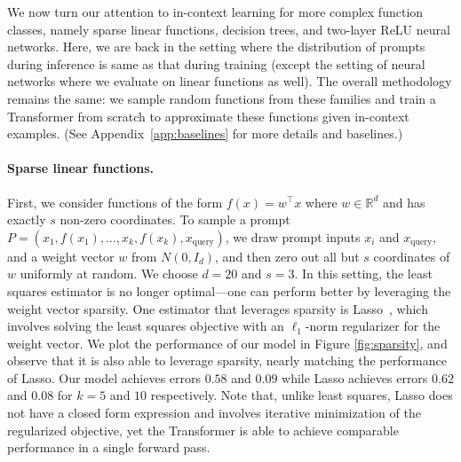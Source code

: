 We now turn our attention to in-context learning for more complex function classes, namely sparse linear functions, decision trees, and two-layer ReLU neural networks. Here, we are back in the setting where the distribution of prompts during inference is same as that during training (except the setting of neural networks where we evaluate on linear functions as well).
The overall methodology remains the same: we sample random functions from these families and train a Transformer from scratch to approximate these functions given in-context examples. (See Appendix~\ref{app:baselines} for more details and baselines.) 

\paragraph{Sparse linear functions.}
First, we consider functions of the form $f(x) = w^\top x$ where $w \in \mathbb{R}^d$ and has exactly $s$ non-zero coordinates.
To sample a prompt $P = (x_1, f(x_1), \ldots, x_k,f(x_k), x_\text{query})$, we draw prompt inputs $x_i$ and $x_\text{query}$, and a weight vector $w$ from $N(0, I_d)$, and then zero out all but $s$ coordinates of $w$ uniformly at random. 
We choose $d = 20$ and $s = 3$.
In this setting, the least squares estimator is no longer optimal---one can perform better by leveraging the weight vector sparsity. 
One estimator that leverages sparsity is Lasso~\citep{tibshirani1996regression}, which involves solving the least squares objective with an $\ell_1$-norm regularizer for the weight vector.
We plot the performance of our model in Figure \ref{fig:sparsity}, and observe that it is also able to leverage sparsity, nearly matching the performance of Lasso. Our model achieves errors $0.58$ and $0.09$ while Lasso achieves errors $0.62$ and $0.08$ for $k = 5$ and $10$ respectively. Note that, unlike least squares, Lasso does not have a closed form expression and involves iterative minimization of the regularized objective, yet the Transformer is able to achieve comparable performance in a single forward pass.

